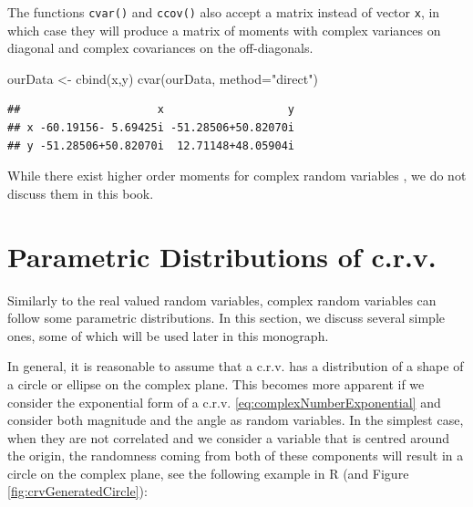 \documentclass[
]{book}
\newenvironment{Shaded}{\begin{snugshade}}{\end{snugshade}}
\newcommand{\AttributeTok}[1]{\textcolor[rgb]{0.77,0.63,0.00}{#1}}
\newcommand{\FunctionTok}[1]{\textcolor[rgb]{0.00,0.00,0.00}{#1}}
\newcommand{\NormalTok}[1]{#1}
\newcommand{\OtherTok}[1]{\textcolor[rgb]{0.56,0.35,0.01}{#1}}
\newcommand{\StringTok}[1]{\textcolor[rgb]{0.31,0.60,0.02}{#1}}
\begin{document}
The functions \texttt{cvar()} and \texttt{ccov()} also accept a matrix instead of vector \texttt{x}, in which case they will produce a matrix of moments with complex variances on diagonal and complex covariances on the off-diagonals.

\begin{Shaded}
\begin{Highlighting}[]
\NormalTok{ourData }\OtherTok{\textless{}{-}} \FunctionTok{cbind}\NormalTok{(x,y)}
\FunctionTok{cvar}\NormalTok{(ourData, }\AttributeTok{method=}\StringTok{"direct"}\NormalTok{)}
\end{Highlighting}
\end{Shaded}

\begin{verbatim}
##                     x                   y
## x -60.19156- 5.69425i -51.28506+50.82070i
## y -51.28506+50.82070i  12.71148+48.05904i
\end{verbatim}

While there exist higher order moments for complex random variables \citep[see, for example,][]{Javidi2011}, we do not discuss them in this book.

\hypertarget{parametric-distributions-of-c.r.v.}{%
\section{Parametric Distributions of c.r.v.}\label{parametric-distributions-of-c.r.v.}}

Similarly to the real valued random variables, complex random variables can follow some parametric distributions. In this section, we discuss several simple ones, some of which will be used later in this monograph.

In general, it is reasonable to assume that a c.r.v. has a distribution of a shape of a circle or ellipse on the complex plane. This becomes more apparent if we consider the exponential form of a c.r.v. \eqref{eq:complexNumberExponential} and consider both magnitude and the angle as random variables. In the simplest case, when they are not correlated and we consider a variable that is centred around the origin, the randomness coming from both of these components will result in a circle on the complex plane, see the following example in R (and Figure \ref{fig:crvGeneratedCircle}):
\end{document}
